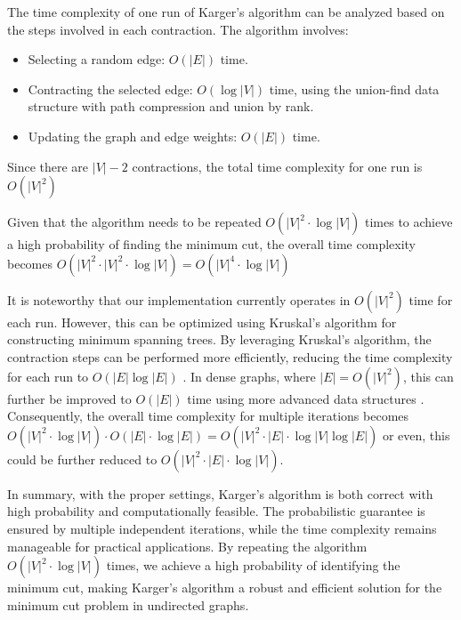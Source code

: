     The time complexity of one run of Karger's algorithm can be analyzed based on the steps involved in each contraction. The algorithm involves:
    \begin{itemize}
        \item Selecting a random edge: \( O(|E|) \) time.
        \item Contracting the selected edge: \( O(\log |V|) \) time, using the union-find data structure with path compression and union by rank.
        \item Updating the graph and edge weights: \( O(|E|) \) time.
    \end{itemize}
    Since there are \( |V| - 2 \) contractions, the total time complexity for one run is \(O(|V|^2)\)

    Given that the algorithm needs to be repeated \( O(|V|^2 \cdot \log |V|) \) times to achieve a high probability of finding the minimum cut, the overall time complexity becomes \(O(|V|^2 \cdot |V|^2 \cdot \log |V|) = O(|V|^4 \cdot \log |V|)\)
    
    It is noteworthy that our implementation currently operates in \( O(|V|^2) \) time for each run. However, this can be optimized using Kruskal's algorithm for constructing minimum spanning trees. By leveraging Kruskal's algorithm, the contraction steps can be performed more efficiently, reducing the time complexity for each run to \( O(|E| \log |E|) \) \cite{kruskal1956shortest}. In dense graphs, where \( |E| = O(|V|^2) \), this can further be improved to \( O(|E|) \) time using more advanced data structures \cite{karger1993global}. Consequently, the overall time complexity for multiple iterations becomes \( O(|V|^2 \cdot \log |V|) \cdot O(|E| \cdot \log |E|) = O(|V|^2 \cdot |E| \cdot \log |V| \log |E|) \) or even, this could be further reduced to \( O(|V|^2 \cdot |E| \cdot \log |V|) \).

    In summary, with the proper settings, Karger's algorithm is both correct with high probability and computationally feasible. The probabilistic guarantee is ensured by multiple independent iterations, while the time complexity remains manageable for practical applications. By repeating the algorithm \( O(|V|^2 \cdot \log |V|) \) times, we achieve a high probability of identifying the minimum cut, making Karger's algorithm a robust and efficient solution for the minimum cut problem in undirected graphs.
